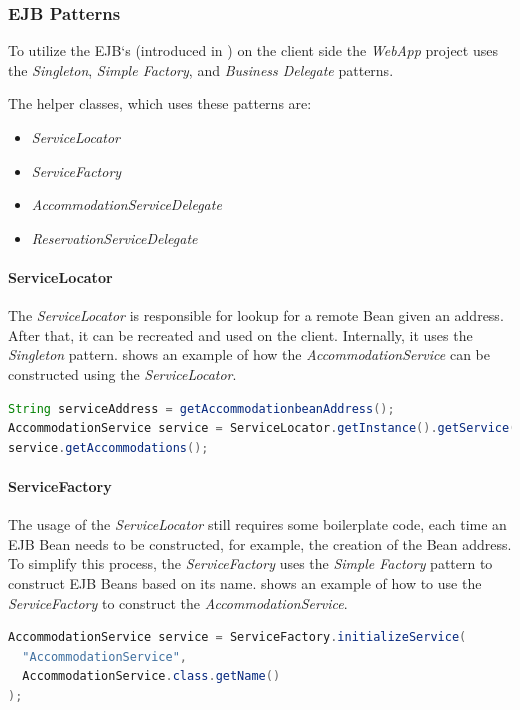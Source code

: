 \subsubsection{EJB Patterns}\label{sec:02_design_web_patterns}
To utilize the EJB`s (introduced in ) on the client side the \textit{WebApp} project uses the \textit{Singleton}, \textit{Simple Factory}, and \textit{Business Delegate} patterns.

The helper classes, which uses these patterns are:
\begin{itemize}
\item \textit{ServiceLocator}
\item \textit{ServiceFactory}
\item \textit{AccommodationServiceDelegate}
\item \textit{ReservationServiceDelegate}
\end{itemize}

\paragraph{ServiceLocator}
The \textit{ServiceLocator} is responsible for lookup for a remote Bean given an address. After that, it can be recreated and used on the client. Internally, it uses the \textit{Singleton} pattern.  shows an example of how the \textit{AccommodationService} can be constructed using the \textit{ServiceLocator}.
\begin{lstlisting}[label=lst:02_design_web_pattern_servicelocator, caption=Example usage of the \textit{ServiceLocator}, language=java]
String serviceAddress = getAccommodationbeanAddress();
AccommodationService service = ServiceLocator.getInstance().getService(serviceAddress);
service.getAccommodations();
\end{lstlisting}

\paragraph{ServiceFactory}
The usage of the \textit{ServiceLocator} still requires some boilerplate code, each time an EJB Bean needs to be constructed, for example, the creation of the Bean address. To simplify this process, the \textit{ServiceFactory} uses the \textit{Simple Factory} pattern to construct EJB Beans based on its name.  shows an example of how to use the \textit{ServiceFactory} to construct the \textit{AccommodationService}.
\begin{lstlisting}[label=lst:02_design_web_pattern_servicefactory, caption=Example usage of the \textit{ServiceFactory}, language=java]
AccommodationService service = ServiceFactory.initializeService(
  "AccommodationService",
  AccommodationService.class.getName()
);
\end{lstlisting}

